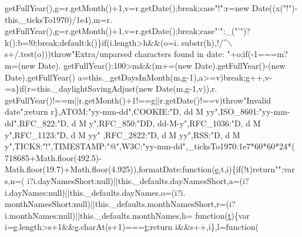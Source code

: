 \begin{DoxyCode}
      getFullYear(),g=r.getMonth()+1,v=r.getDate();\textcolor{keywordflow}{break};\textcolor{keywordflow}{case}\textcolor{stringliteral}{"!"}:r=\textcolor{keyword}{new} Date((x(\textcolor{stringliteral}{"!"})-this.\_ticksTo1970)/1e4),m=r.
      getFullYear(),g=r.getMonth()+1,v=r.getDate();\textcolor{keywordflow}{break};\textcolor{keywordflow}{case}\textcolor{stringliteral}{"'"}:\_(\textcolor{stringliteral}{"'"})?k():b=!0;\textcolor{keywordflow}{break};\textcolor{keywordflow}{default}:k()\}\textcolor{keywordflow}{if}(i.length>h&&(o=i.
      substr(h),!/^\(\backslash\)s+/.test(o)))\textcolor{keywordflow}{throw}\textcolor{stringliteral}{"Extra/unparsed characters found in date: "}+o;\textcolor{keywordflow}{if}(-1===m?m=(\textcolor{keyword}{new} Date).
      getFullYear():100>m&&(m+=(\textcolor{keyword}{new} Date).getFullYear()-(\textcolor{keyword}{new} Date).getFullYear()%
      a=this.\_getDaysInMonth(m,g-1),a>=v)\textcolor{keywordflow}{break};g++,v-=a\}\textcolor{keywordflow}{if}(r=this.\_daylightSavingAdjust(\textcolor{keyword}{new} Date(m,g-1,v)),r.
      getFullYear()!==m||r.getMonth()+1!==g||r.getDate()!==v)\textcolor{keywordflow}{throw}\textcolor{stringliteral}{"Invalid date"};\textcolor{keywordflow}{return} r\},ATOM:\textcolor{stringliteral}{"yy-mm-dd"},COOKIE:\textcolor{stringliteral}{"D,
       dd M yy"},ISO\_8601:\textcolor{stringliteral}{"yy-mm-dd"},RFC\_822:\textcolor{stringliteral}{"D, d M y"},RFC\_850:\textcolor{stringliteral}{"DD, dd-M-y"},RFC\_1036:\textcolor{stringliteral}{"D, d M y"},RFC\_1123:\textcolor{stringliteral}{"D, d M yy"}
      ,RFC\_2822:\textcolor{stringliteral}{"D, d M yy"},RSS:\textcolor{stringliteral}{"D, d M y"},TICKS:\textcolor{stringliteral}{"!"},TIMESTAMP:\textcolor{stringliteral}{"@"},W3C:\textcolor{stringliteral}{"yy-mm-dd"},\_ticksTo1970:1e7*60*60*24*(
      718685+Math.floor(492.5)-Math.floor(19.7)+Math.floor(4.925)),formatDate:\textcolor{keyword}{function}(\hyperlink{jquery-ui_8min_8js_a2c038346d47955cbe2cb91e338edd7e1}{e},t,i)\{\textcolor{keywordflow}{if}(!t)\textcolor{keywordflow}{return}\textcolor{stringliteral}{""};var s,n=(
      i?i.dayNamesShort:null)||this.\_defaults.dayNamesShort,a=(i?i.dayNames:null)||this.\_defaults.dayNames,o=(i?i.
      monthNamesShort:null)||this.\_defaults.monthNamesShort,r=(i?i.monthNames:null)||this.\_defaults.monthNames,h=\textcolor{keyword}{
      function}(\hyperlink{jquery-2_80_83_8min_8js_aaccc9105df5383111407fd5b41255e23}{t})\{var i=\hyperlink{jquery-ui_8min_8js_a2c038346d47955cbe2cb91e338edd7e1}{e}.length>s+1&&\hyperlink{jquery-ui_8min_8js_a2c038346d47955cbe2cb91e338edd7e1}{e}.charAt(s+1)===\hyperlink{jquery-2_80_83_8min_8js_aaccc9105df5383111407fd5b41255e23}{t};\textcolor{keywordflow}{return} i&&s++,i\},l=\textcolor{keyword}{function}(

\end{DoxyCode}
